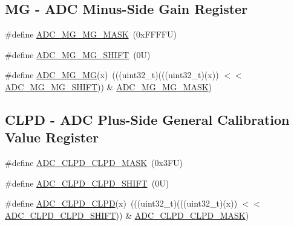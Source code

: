 \subsection*{MG -\/ A\+DC Minus-\/\+Side Gain Register}
\begin{DoxyCompactItemize}
\item 
\#define \mbox{\hyperlink{group___a_d_c___register___masks_ga9f415258af1bad0159dd605efccd043b}{A\+D\+C\+\_\+\+M\+G\+\_\+\+M\+G\+\_\+\+M\+A\+SK}}~(0x\+F\+F\+F\+F\+U)
\item 
\#define \mbox{\hyperlink{group___a_d_c___register___masks_ga4b2717da089f0de5bd41ef91001b7cfe}{A\+D\+C\+\_\+\+M\+G\+\_\+\+M\+G\+\_\+\+S\+H\+I\+FT}}~(0\+U)
\item 
\#define \mbox{\hyperlink{group___a_d_c___register___masks_gaca09277ff124324eca091b84eb116176}{A\+D\+C\+\_\+\+M\+G\+\_\+\+MG}}(x)~(((uint32\+\_\+t)(((uint32\+\_\+t)(x)) $<$$<$ \mbox{\hyperlink{group___a_d_c___register___masks_ga4b2717da089f0de5bd41ef91001b7cfe}{A\+D\+C\+\_\+\+M\+G\+\_\+\+M\+G\+\_\+\+S\+H\+I\+FT}})) \& \mbox{\hyperlink{group___a_d_c___register___masks_ga9f415258af1bad0159dd605efccd043b}{A\+D\+C\+\_\+\+M\+G\+\_\+\+M\+G\+\_\+\+M\+A\+SK}})
\end{DoxyCompactItemize}
\subsection*{C\+L\+PD -\/ A\+DC Plus-\/\+Side General Calibration Value Register}
\begin{DoxyCompactItemize}
\item 
\#define \mbox{\hyperlink{group___a_d_c___register___masks_gaae8d6090ede9d73497ae3e0b4fa2c6cd}{A\+D\+C\+\_\+\+C\+L\+P\+D\+\_\+\+C\+L\+P\+D\+\_\+\+M\+A\+SK}}~(0x3\+F\+U)
\item 
\#define \mbox{\hyperlink{group___a_d_c___register___masks_ga14a354b0de262fc93f30472e99bbe9bc}{A\+D\+C\+\_\+\+C\+L\+P\+D\+\_\+\+C\+L\+P\+D\+\_\+\+S\+H\+I\+FT}}~(0\+U)
\item 
\#define \mbox{\hyperlink{group___a_d_c___register___masks_gad24bf778e8245118707b43a195a7ddf3}{A\+D\+C\+\_\+\+C\+L\+P\+D\+\_\+\+C\+L\+PD}}(x)~(((uint32\+\_\+t)(((uint32\+\_\+t)(x)) $<$$<$ \mbox{\hyperlink{group___a_d_c___register___masks_ga14a354b0de262fc93f30472e99bbe9bc}{A\+D\+C\+\_\+\+C\+L\+P\+D\+\_\+\+C\+L\+P\+D\+\_\+\+S\+H\+I\+FT}})) \& \mbox{\hyperlink{group___a_d_c___register___masks_gaae8d6090ede9d73497ae3e0b4fa2c6cd}{A\+D\+C\+\_\+\+C\+L\+P\+D\+\_\+\+C\+L\+P\+D\+\_\+\+M\+A\+SK}})
\end{DoxyCompactItemize}
